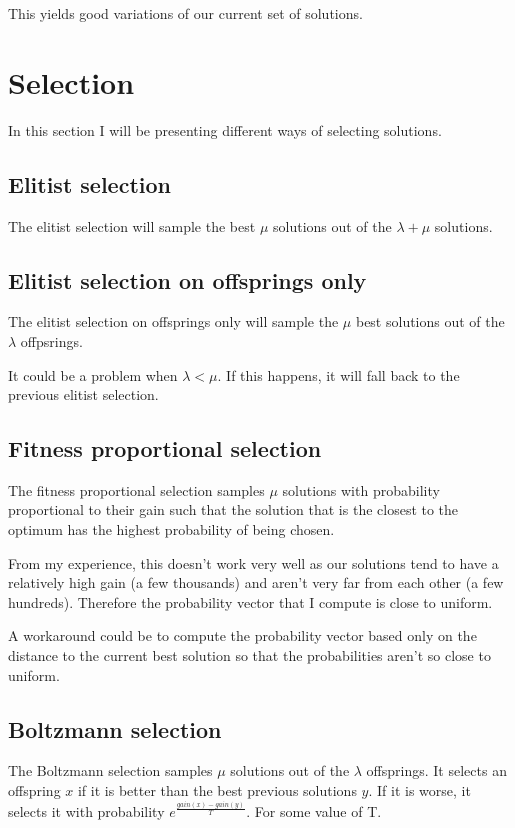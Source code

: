 \documentclass{article}
\theoremstyle{plain} %
\theoremstyle{definition} %
\begin{document}
This yields good variations of our current set of solutions.

\section{Selection}

In this section I will be presenting different ways of selecting solutions.

\subsection{Elitist selection}

The elitist selection will sample the best $\mu$ solutions out of the $\lambda
+ \mu$ solutions.

\subsection{Elitist selection on offsprings only}

The elitist selection on offsprings only will sample the $\mu$ best solutions
out of the $\lambda$ offpsrings.

It could be a problem when $\lambda < \mu$. If this happens, it will fall back
to the previous elitist selection.

\subsection{Fitness proportional selection}

The fitness proportional selection samples $\mu$ solutions with probability
proportional to their gain such that the solution that is the closest to the
optimum has the highest probability of being chosen.

From my experience, this doesn't work very well as our solutions tend to have a
relatively high gain (a few thousands) and aren't very far from each other (a
few hundreds). Therefore the probability vector that I compute is close to
uniform.

A workaround could be to compute the probability vector based only on the
distance to the current best solution so that the probabilities aren't so close
to uniform.

\subsection{Boltzmann selection}

The Boltzmann selection samples $\mu$ solutions out of the $\lambda$
offsprings. It selects an offspring $x$ if it is better than the best previous
solutions $y$. If it is worse, it selects it with probability $e^{\frac{gain(x)
- gain(y)}{T}}$. For some value of T.
\end{document}
